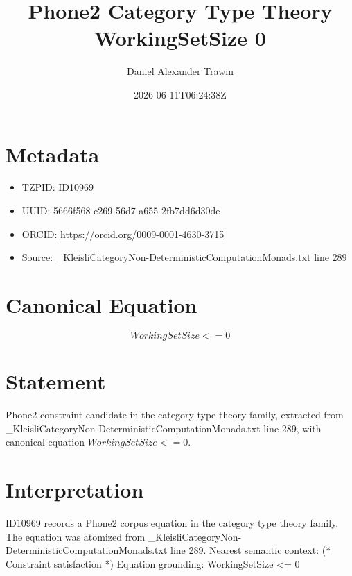 \documentclass[11pt]{article}
\title{Phone2 Category Type Theory WorkingSetSize 0}
\author{Daniel Alexander Trawin}
\date{2026-06-11T06:24:38Z}
\begin{document}
\maketitle
\section*{Metadata}
\begin{itemize}
\item TZPID: ID10969
\item UUID: 5666f568-c269-56d7-a655-2fb7dd6d30de
\item ORCID: \url{https://orcid.org/0009-0001-4630-3715}
\item Source: _KleisliCategoryNon-DeterministicComputationMonads.txt line 289
\end{itemize}
\section*{Canonical Equation}
\[
WorkingSetSize <= 0
\]
\section*{Statement}
Phone2 constraint candidate in the category type theory family, extracted from _KleisliCategoryNon-DeterministicComputationMonads.txt line 289, with canonical equation $WorkingSetSize <= 0$.
\section*{Interpretation}
ID10969 records a Phone2 corpus equation in the category type theory family. The equation was atomized from _KleisliCategoryNon-DeterministicComputationMonads.txt line 289. Nearest semantic context: (* Constraint satisfaction *) Equation grounding: WorkingSetSize <= 0
\end{document}
